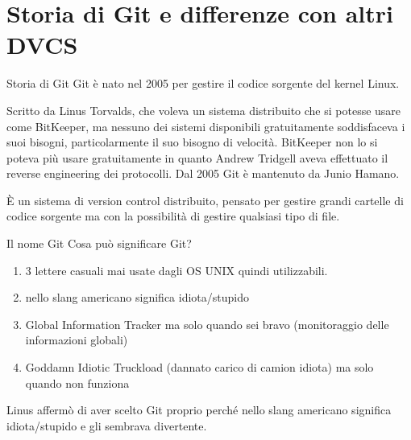 \documentclass[aspectratio=169,handout,10pt]{beamer}
\begin{document}
\section{Storia di Git e differenze con altri DVCS}

\begin{frame}{Storia di Git}
    Git è nato nel 2005 per gestire il codice sorgente del kernel Linux.

    Scritto da Linus Torvalds, che voleva un sistema distribuito che si potesse usare come BitKeeper, ma nessuno dei sistemi disponibili gratuitamente soddisfaceva i suoi bisogni, particolarmente il suo bisogno di velocità. BitKeeper non lo si poteva più usare gratuitamente in quanto Andrew Tridgell aveva effettuato il reverse engineering dei protocolli. Dal 2005 Git è mantenuto da Junio Hamano.
    
    È un sistema di version control distribuito, pensato per gestire grandi cartelle di codice sorgente ma con la possibilità di gestire qualsiasi tipo di file.
\end{frame}
\begin{frame}{Il nome Git}
    Cosa può significare Git?
    \begin{enumerate}
        \item 3 lettere casuali mai usate dagli OS UNIX quindi utilizzabili.
        \item nello slang americano significa idiota/stupido
        \item Global Information Tracker ma solo quando sei bravo (monitoraggio delle informazioni globali)
        \item Goddamn Idiotic Truckload (dannato carico di camion idiota) ma solo quando non funziona
    \end{enumerate}
    Linus affermò di aver scelto Git proprio perché nello slang americano significa idiota/stupido e gli sembrava divertente.
\end{frame}
\end{document}
